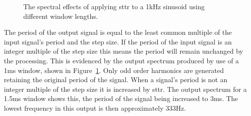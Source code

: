 			\begin{figure}[h!]
				\centering
				\quad
				\caption{The spectral effects of applying \acrshort{sttr} to a 1kHz sinusoid using
					different window lengths.}
				\label{fig:STTRSpectra}
			\end{figure}

			The period of the output signal is equal to the least common multiple of the input signal's period
			and the step size. If the period of the input signal is an integer multiple of the step size this
			means the period will remain unchanged by the processing. This is evidenced by the output spectrum
			produced by use of a 1ms window, shown in Figure~\ref{fig:STTRSpectra}. Only odd order harmonics
			are generated retaining the original period of the signal. When a signal's period is not an integer
			multiple of the step size it is increased by \acrshort{sttr}. The output spectrum for a 1.5ms
			window shows this, the period of the signal being increased to 3ms. The lowest frequency in this
			output is then approximately 333Hz.

